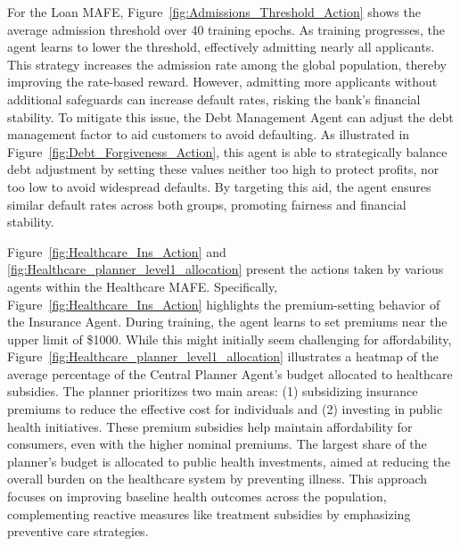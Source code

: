 For the Loan MAFE, Figure~\ref{fig:Admissions_Threshold_Action} shows the average admission threshold over 40 training epochs. As training progresses, the agent learns to lower the threshold, effectively admitting nearly all applicants. This strategy increases the admission rate among the global population, thereby improving the rate-based reward. However, admitting more applicants without additional safeguards can increase default rates, risking the bank's financial stability. To mitigate this issue, the Debt Management Agent can adjust the debt management factor to aid customers to avoid defaulting. As illustrated in Figure~\ref{fig:Debt_Forgiveness_Action}, this agent is able to strategically balance debt adjustment by setting these values neither too high to protect profits, nor too low to avoid widespread defaults. By targeting this aid, the agent ensures similar default rates across both groups, promoting fairness and financial stability.

Figure~\ref{fig:Healthcare_Ins_Action} and \ref{fig:Healthcare_planner_level1_allocation} present the actions taken by various agents within the Healthcare MAFE. Specifically, Figure~\ref{fig:Healthcare_Ins_Action} highlights the premium-setting behavior of the Insurance Agent. During training, the agent learns to set premiums near the upper limit of \$1000. While this might initially seem challenging for affordability, Figure~\ref{fig:Healthcare_planner_level1_allocation} illustrates a heatmap of the average percentage of the Central Planner Agent's budget allocated to healthcare subsidies. The planner prioritizes two main areas: (1) subsidizing insurance premiums to reduce the effective cost for individuals and (2) investing in public health initiatives. These premium subsidies help maintain affordability for consumers, even with the higher nominal premiums. The largest share of the planner’s budget is allocated to public health investments, aimed at reducing the overall burden on the healthcare system by preventing illness. This approach focuses on improving baseline health outcomes across the population, complementing reactive measures like treatment subsidies by emphasizing preventive care strategies.

